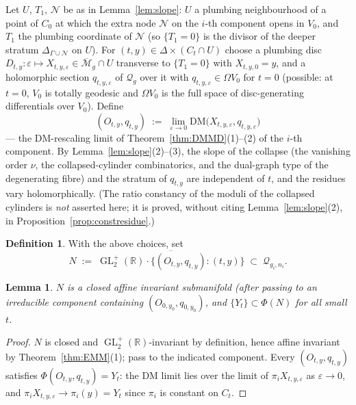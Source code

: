 \documentclass[11pt]{article}
\newcommand{\R}{\mathbb{R}}
\newcommand{\cQ}{\mathcal{Q}}
\newcommand{\M}{\mathcal{M}}
\DeclareMathOperator{\GL}{GL}
\newtheorem{lem}[thm]{Lemma}
\theoremstyle{definition}
\newtheorem{defn}[thm]{Definition}
\theoremstyle{remark}
\begin{document}
Let $U$, $T_1$, $\mathcal N$ be as in Lemma~\ref{lem:slope}: $U$ a
plumbing neighbourhood of a point of $C_0$ at which the extra node
$\mathcal N$ on the $i$-th component opens in $V_0$, and $T_1$ the
plumbing coordinate of $\mathcal N$ (so $\{T_1 = 0\}$ is the divisor of
the deeper stratum $\Delta_{\Gamma \cup \mathcal N}$ on $U$). For
$(t, y) \in \Delta \times (C_t \cap U)$ choose a plumbing disc
$D_{t,y} : \varepsilon \mapsto X_{t,y,\varepsilon} \in
\overline{\M}_g \cap U$ transverse to $\{T_1=0\}$ with
$X_{t,y,0} = y$, and a holomorphic section $q_{t,y,\varepsilon}$ of
$\cQ_g$ over it with $q_{t,y,\varepsilon} \in \Omega V_0$ for $t = 0$
(possible: at $t = 0$, $V_0$ is totally geodesic and $\Omega V_0$ is the
full space of disc-generating differentials over $V_0$). Define
\[
(O_{t,y}, q_{t,y}) \;:=\; \lim_{\varepsilon \to 0}
\mathrm{DM}\bigl(X_{t,y,\varepsilon}, q_{t,y,\varepsilon}\bigr)
\]
--- the DM-rescaling limit of Theorem~\ref{thm:DMMD}(1)--(2) of the
$i$-th component. By Lemma~\ref{lem:slope}(2)--(3), the slope of the
collapse (the vanishing order $\nu$, the collapsed-cylinder
combinatorics, and the dual-graph type of the degenerating fibre) and
the stratum of $q_{t,y}$ are independent of $t$, and the residues
vary holomorphically. (The ratio constancy of the moduli of the
collapsed cylinders is \emph{not} asserted here; it is proved, without
citing Lemma~\ref{lem:slope}(2), in
Proposition~\ref{prop:constresidue}.)

\begin{defn}\label{def:N}
With the above choices, set
\[
N \;:=\; \overline{\GL_2^+(\R) \cdot \{(O_{t,y},q_{t,y}) : (t,y)\}}
\;\subset\; \cQ_{g_i,n_i}.
\]
\end{defn}

\begin{lem}\label{lem:Naffine}
$N$ is a closed affine invariant submanifold (after passing to an
irreducible component containing $(O_{0,y_0}, q_{0,y_0})$, and
$\{Y_t\} \subset \Phi(N)$ for all small $t$.
\end{lem}

\begin{proof}
$N$ is closed and $\GL_2^+(\R)$-invariant by definition, hence affine
invariant by Theorem~\ref{thm:EMM}(1); pass to the indicated component.
Every $(O_{t,y},q_{t,y})$ satisfies $\Phi(O_{t,y},q_{t,y}) = Y_t$: the
DM limit lies over the limit of $\pi_i X_{t,y,\varepsilon}$ as
$\varepsilon \to 0$, and $\pi_i X_{t,y,\varepsilon} \to \pi_i(y) =
Y_t$ since $\pi_i$ is constant on $C_t$.
\end{proof}
\end{document}
